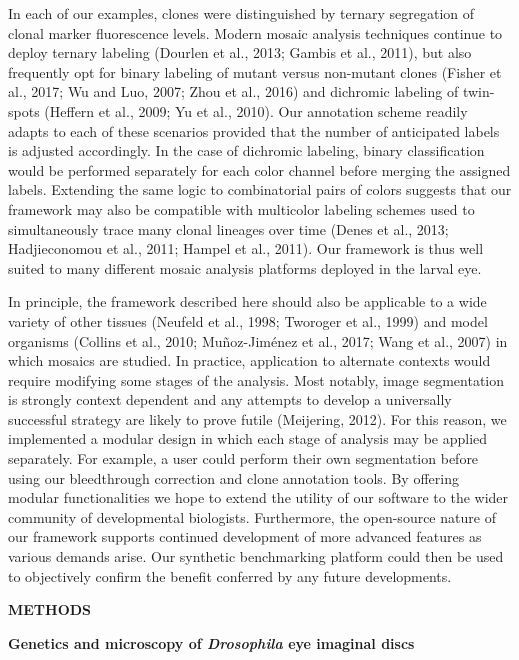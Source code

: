 In each of our examples, clones were distinguished by ternary segregation of clonal marker fluorescence levels. Modern mosaic analysis techniques continue to deploy ternary labeling (Dourlen et al., 2013; Gambis et al., 2011), but also frequently opt for binary labeling of mutant versus non-mutant clones (Fisher et al., 2017; Wu and Luo, 2007; Zhou et al., 2016) and dichromic labeling of twin-spots (Heffern et al., 2009; Yu et al., 2010). Our annotation scheme readily adapts to each of these scenarios provided that the number of anticipated labels is adjusted accordingly. In the case of dichromic labeling, binary classification would be performed separately for each color channel before merging the assigned labels. Extending the same logic to combinatorial pairs of colors suggests that our framework may also be compatible with multicolor labeling schemes used to simultaneously trace many clonal lineages over time (Denes et al., 2013; Hadjieconomou et al., 2011; Hampel et al., 2011). Our framework is thus well suited to many different mosaic analysis platforms deployed in the larval eye.

In principle, the framework described here should also be applicable to a wide variety of other tissues (Neufeld et al., 1998; Tworoger et al., 1999) and model organisms (Collins et al., 2010; Muñoz-Jiménez et al., 2017; Wang et al., 2007) in which mosaics are studied. In practice, application to alternate contexts would require modifying some stages of the analysis. Most notably, image segmentation is strongly context dependent and any attempts to develop a universally successful strategy are likely to prove futile (Meijering, 2012). For this reason, we implemented a modular design in which each stage of analysis may be applied separately. For example, a user could perform their own segmentation before using our bleedthrough correction and clone annotation tools. By offering modular functionalities we hope to extend the utility of our software to the wider community of developmental biologists. Furthermore, the open-source nature of our framework supports continued development of more advanced features as various demands arise. Our synthetic benchmarking platform could then be used to objectively confirm the benefit conferred by any future developments.

\textbf{METHODS}

\textbf{Genetics and microscopy of \emph{Drosophila} eye imaginal discs}

